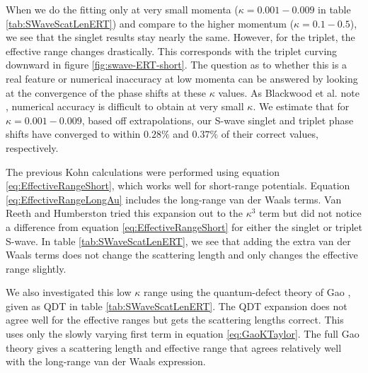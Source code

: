 \documentclass[preprint,showpacs,preprintnumbers,amsmath,amssymb]{revtex4}
\begin{document}
When we do the fitting only at very small momenta ($\kappa = 0.001 - 0.009$ in table \ref{tab:SWaveScatLenERT}) and compare to the higher momentum ($\kappa = 0.1 - 0.5$), we see that the singlet results stay nearly the same. However, for the triplet, the effective range changes drastically. This corresponds with the triplet curving downward in figure \ref{fig:swave-ERT-short}. The question as to whether this is a real feature or numerical inaccuracy at low momenta can be answered by looking at the convergence of the phase shifts at these $\kappa$ values. As Blackwood et al. note \cite{Blackwood2002}, numerical accuracy is difficult to obtain at very small $\kappa$. We estimate that for $\kappa = 0.001 - 0.009$, based off extrapolations, our S-wave singlet and triplet phase shifts have converged to within $0.28\%$ and $0.37\%$ of their correct values, respectively.

The previous Kohn calculations \cite{VanReeth2003} were performed using equation \ref{eq:EffectiveRangeShort}, which works well for short-range potentials. Equation \ref{eq:EffectiveRangeLongAu} includes the long-range van der Waals terms. Van Reeth and Humberston \cite{VanReeth2003} tried this expansion out to the $\kappa^3$ term but did not notice a difference from equation \ref{eq:EffectiveRangeShort} for either the singlet or triplet S-wave. In table \ref{tab:SWaveScatLenERT}, we see that adding the extra van der Waals terms does not change the scattering length and only changes the effective range slightly.

We also investigated this low $\kappa$ range using the quantum-defect theory of Gao \cite{Gao1998}, given as QDT in table \ref{tab:SWaveScatLenERT}. The QDT expansion does not agree well for the effective ranges but gets the scattering lengths correct. This uses only the slowly varying first term in equation \ref{eq:GaoKTaylor}. The full Gao theory gives a scattering length and effective range that agrees relatively well with the long-range van der Waals expression.
\end{document}
